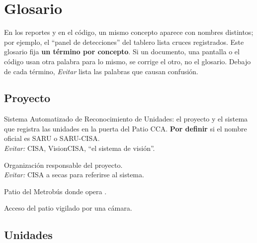 \chapter{Glosario}
\label{cap:glosario}

En los reportes y en el código, un mismo concepto aparece con nombres
distintos; por ejemplo, el ``panel de detecciones'' del tablero lista
cruces registrados. Este glosario fija
\textbf{un término por concepto}. Si un documento, una pantalla o el código
usan otra palabra para lo mismo, se corrige el otro, no el glosario. Debajo
de cada término, \emph{Evitar} lista las palabras que causan confusión.

\section{Proyecto}

\begin{description}[style=nextline]
  \item[SARU] Sistema Automatizado de Reconocimiento de Unidades: el
        proyecto y el sistema que registra las unidades en la puerta del
        Patio CCA. \textbf{Por definir} si el nombre oficial es SARU o
        SARU-CISA.\\
        \emph{Evitar:} CISA, VisionCISA, ``el sistema de visión''.
  \item[Grupo CISA] Organización responsable del proyecto.\\
        \emph{Evitar:} CISA a secas para referirse al sistema.
  \item[Patio CCA] Patio del Metrobús donde opera \saru{}.
  \item[Puerta] Acceso del patio vigilado por una cámara.
\end{description}

\section{Unidades}

